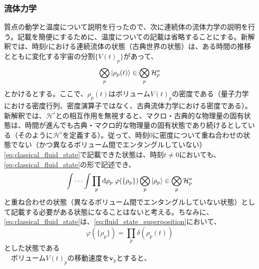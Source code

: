 \subsubsection{流体力学}
質点の動学と温度について説明を行ったので、次に連続体の流体力学の説明を行う。記載を簡便にするために、温度についての記載は省略することにする。新解釈では、時刻$t$における連続流体の状態（古典世界の状態）は、ある時間の推移とともに変化する宇宙の分割$\{V(t)_p\}$があって、
\begin{equation}
    \label{eq:classical_fluid_state}
    \bigotimes_p \ket{\rho_p(t)} \in \bigotimes_p \mathcal{H}_p^a
\end{equation}
とかけるとする。ここで、$\rho_p(t)$はボリューム$V(t)_p$の密度である（量子力学における密度行列、密度演算子ではなく、古典流体力学における密度である）。新解釈では、$\mathcal{H}^i$との相互作用を無視すると、マクロ・古典的な物理量の固有状態は、時間が進んでも古典・マクロ的な物理量の固有状態であり続けるとしている（そのように$\mathcal{H}^i$を定義する）。従って、時刻$0$に密度について重ね合わせの状態でない（かつ異なるボリューム間でエンタングルしていない）\eqref{eq:classical_fluid_state}で記載できた状態は、時刻$t \neq 0$においても、\eqref{eq:classical_fluid_state}の形で記述でき、
\begin{equation}
    \label{eq:fluid_state_superposition}
   \int \cdots \int \prod_p \mathrm{d}\rho_p \; \varphi(\{\rho_p\}) \bigotimes_p \ket{\rho_p} \in \bigotimes_p \mathcal{H}_p^a
\end{equation}
と重ね合わせの状態（異なるボリューム間でエンタングルしていない状態）として記載する必要がある状態になることはないと考える。ちなみに、\eqref{eq:classical_fluid_state}は、\eqref{eq:fluid_state_superposition}において、
\begin{equation}
   \varphi(\{\rho_p\}) = \prod_p \delta(\rho_p(t))
\end{equation}
とした状態である\\
　ボリューム$V(t)_p$の移動速度を$\bm{v}_p$とすると、